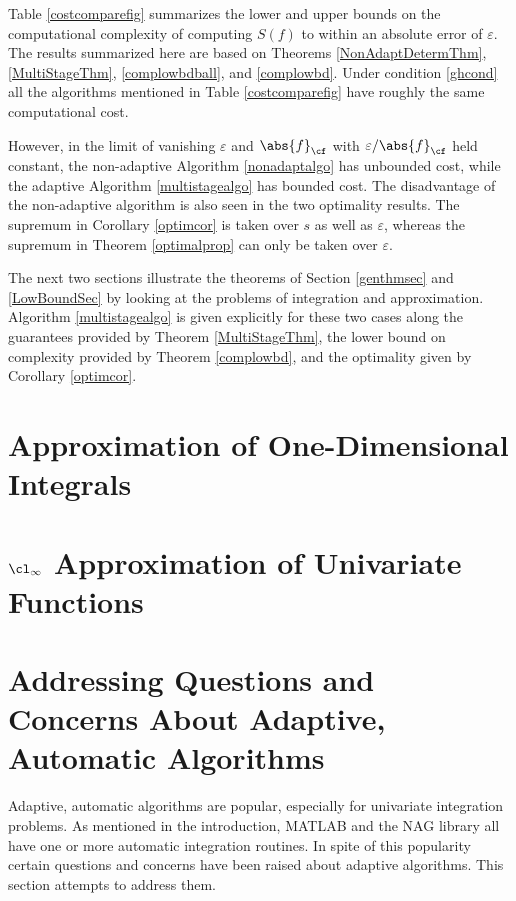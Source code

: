 \documentclass[]{elsarticle}
\theoremstyle{definition}
\theoremstyle{remark}
\newcommand{\Fnorm}[1]{\abs{#1}_{\cf}}
\begin{document}
Table \ref{costcomparefig} summarizes the lower and upper bounds on the computational complexity of computing $S(f)$ to within an absolute error of $\varepsilon$.  The results summarized here are based on Theorems \ref{NonAdaptDetermThm}, \ref{MultiStageThm}, \ref{complowbdball}, and \ref{complowbd}.  Under condition \eqref{ghcond} all the algorithms mentioned in Table \ref{costcomparefig} have roughly the same computational cost.  

However, in the limit of vanishing $\varepsilon$ and $\Fnorm{f}$ with $\varepsilon/\Fnorm{f}$ held constant, the non-adaptive Algorithm \ref{nonadaptalgo} has unbounded cost, while the adaptive Algorithm \ref{multistagealgo} has bounded cost. The disadvantage of the non-adaptive algorithm is also seen in the two optimality results.  The supremum in Corollary \ref{optimcor} is taken over $s$ as well as $\varepsilon$, whereas the supremum in Theorem \ref{optimalprop} can only be taken over $\varepsilon$.

The next two sections illustrate the theorems of Section \ref{genthmsec} and \ref{LowBoundSec} by looking at the problems of integration and approximation. Algorithm \ref{multistagealgo} is given explicitly for these two cases along the guarantees provided by Theorem \ref{MultiStageThm}, the lower bound on complexity provided by Theorem \ref{complowbd}, and the optimality given by Corollary \ref{optimcor}.

\section{Approximation of One-Dimensional Integrals} \label{integsec}



\section{$\cl_{\infty}$ Approximation of Univariate Functions} \label{approxsec}



\section{Addressing Questions and Concerns About Adaptive, Automatic Algorithms} \label{overcomesec}

Adaptive, automatic algorithms are popular, especially for univariate integration problems.  As mentioned in the introduction, MATLAB \cite{TrefEtal12,MAT7.12} and the NAG \cite{NAG23} library all have one or more automatic integration routines.  In spite of this popularity certain questions and concerns have been raised about adaptive algorithms.  This section attempts to address them.
\end{document}

